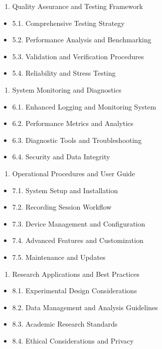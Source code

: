 \documentclass[12pt,a4paper]{article}
\begin{document}
\begin{enumerate}
\item Quality Assurance and Testing Framework
\end{enumerate}
\begin{itemize}
\item 5.1. Comprehensive Testing Strategy
\item 5.2. Performance Analysis and Benchmarking
\item 5.3. Validation and Verification Procedures
\item 5.4. Reliability and Stress Testing

\end{itemize}
\begin{enumerate}
\item System Monitoring and Diagnostics
\end{enumerate}
\begin{itemize}
\item 6.1. Enhanced Logging and Monitoring System
\item 6.2. Performance Metrics and Analytics
\item 6.3. Diagnostic Tools and Troubleshooting
\item 6.4. Security and Data Integrity

\end{itemize}
\begin{enumerate}
\item Operational Procedures and User Guide
\end{enumerate}
\begin{itemize}
\item 7.1. System Setup and Installation
\item 7.2. Recording Session Workflow
\item 7.3. Device Management and Configuration
\item 7.4. Advanced Features and Customization
\item 7.5. Maintenance and Updates

\end{itemize}
\begin{enumerate}
\item Research Applications and Best Practices
\end{enumerate}
\begin{itemize}
\item 8.1. Experimental Design Considerations
\item 8.2. Data Management and Analysis Guidelines
\item 8.3. Academic Research Standards
\item 8.4. Ethical Considerations and Privacy

\end{itemize}
\end{document}
